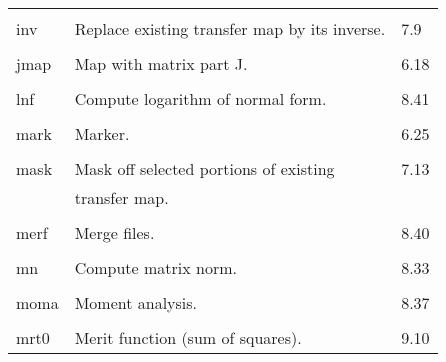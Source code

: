 \begin{center}
\begin{tabular}{lll}
\vspace{-3mm}& &\\
\hspace{1.5em}inv & Replace existing transfer map by its inverse. & \hspace{2em}7.9\\
\vspace{-3mm}& &\\
\hspace{1.5em}jmap    &      Map with matrix part J.      &  \hspace{2em}6.18\\
\vspace{-3mm}& &\\
\hspace{1.5em}lnf    &      Compute logarithm of normal form.      &
\hspace{2em}8.41\\
\vspace{-3mm}& &\\
\hspace{1.5em}mark    &    Marker.              &  \hspace{2em}6.25\\
\vspace{-3mm}& &\\
\hspace{1.5em}mask  &  Mask off selected portions of existing & \hspace{2em}7.13\\
                    & transfer map.                                &\\
\vspace{-3mm}& &\\
\hspace{1.5em}merf    &      Merge files.      &  \hspace{2em}8.40\\
\vspace{-3mm}& &\\
\hspace{1.5em}mn      & Compute matrix norm.       &   \hspace{2em}8.33\\
\vspace{-3mm}& &\\
\hspace{1.5em}moma    &   Moment analysis.  &   \hspace{2em}8.37\\
\vspace{-3mm}& &\\
\hspace{1.5em}mrt0   &  Merit function (sum of squares).   &   \hspace{2em}9.10\\

\end{tabular}
\end{center}

